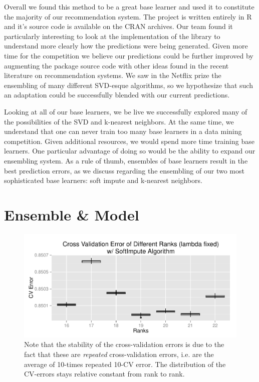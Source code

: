 \documentclass[oneside]{article}
\begin{document}
\begin{description}
Overall we found this method to be a great base learner and used it to constitute the majority of our recommendation system. The project is written entirely in R and it's source code is available on the CRAN archives. Our team found it particularly interesting to look at the implementation of the library to understand more clearly how the predictions were being generated. Given more time for the competition we believe our predictions could be further improved by augmenting the package source code with other ideas found in the recent literature on recommendation systems. We saw in the Netflix prize the ensembling of many different SVD-esque algorithms, so we hypothesize that such an adaptation could be successfully blended with our current predictions.
\end{description}

Looking at all of our base learners, we be live we successfully explored many of the possibilities of the SVD and k-nearest neighbors. At the same time, we understand that one can never train too many base learners in a data mining competition. Given additional resources, we would spend more time training base learners. One particular advantage of doing so would be the ability to expand our ensembling system. As a rule of thumb, ensembles of base learners result in the best prediction errors, as we discuss regarding the ensembling of our two most sophisticated base learners: soft impute and k-nearest neighbors. 

\section{Ensemble \& Model}

\begin{figure}[htpd]
  \centering
  \includegraphics[width = 0.95\linewidth]{cvsi}
  \caption{Note that the stability of the cross-validation errors is due to the fact that these are \textit{repeated} cross-validation errors, i.e. are the average of 10-times repeated 10-CV error. The distribution of the CV-errors stays relative constant from rank to rank.}
  \label{fig:two}
\end{figure}
\end{document}
